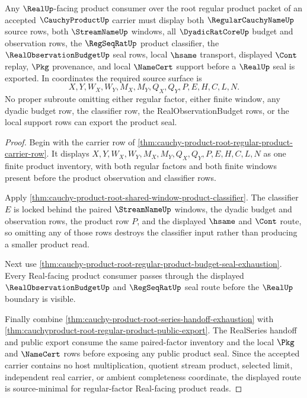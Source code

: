\begin{theorem}
\label{thm:cauchy-product-regular-factor-source-minimality}
Any $\RealUp$-facing product consumer over the root regular product packet of an accepted $\CauchyProductUp$ carrier must display both $\RegularCauchyNameUp$ source rows, both $\StreamNameUp$ windows, all $\DyadicRatCoreUp$ budget and observation rows, the $\RegSeqRatUp$ product classifier, the $\RealObservationBudgetUp$ seal rows, local $\hsame$ transport, displayed $\Cont$ replay, $\Pkg$ provenance, and local $\NameCert$ support before a $\RealUp$ seal is exported. In coordinates the required source surface is
$$
X,Y,W_X,W_Y,M_X,M_Y,Q_X,Q_Y,P,E,H,C,L,N.
$$
No proper subroute omitting either regular factor, either finite window, any dyadic budget row, the classifier row, the RealObservationBudget rows, or the local support rows can export the product seal.
\end{theorem}
\begin{proof}
Begin with the carrier row of \autoref{thm:cauchy-product-root-regular-product-carrier-row}. It displays $X,Y,W_X,W_Y,M_X,M_Y,Q_X,Q_Y,P,E,H,C,L,N$ as one finite product inventory, with both regular factors and both finite windows present before the product observation and classifier rows.

Apply \autoref{thm:cauchy-product-root-shared-window-product-classifier}. The classifier $E$ is locked behind the paired $\StreamNameUp$ windows, the dyadic budget and observation rows, the product row $P$, and the displayed $\hsame$ and $\Cont$ route, so omitting any of those rows destroys the classifier input rather than producing a smaller product read.

Next use \autoref{thm:cauchy-product-root-regular-product-budget-seal-exhaustion}. Every Real-facing product consumer passes through the displayed $\RealObservationBudgetUp$ and $\RegSeqRatUp$ seal route before the $\RealUp$ boundary is visible.

Finally combine \autoref{thm:cauchy-product-root-series-handoff-exhaustion} with \autoref{thm:cauchyproduct-root-regular-product-public-export}. The RealSeries handoff and public export consume the same paired-factor inventory and the local $\Pkg$ and $\NameCert$ rows before exposing any public product seal. Since the accepted carrier contains no host multiplication, quotient stream product, selected limit, independent real carrier, or ambient completeness coordinate, the displayed route is source-minimal for regular-factor Real-facing product reads.
\end{proof}

